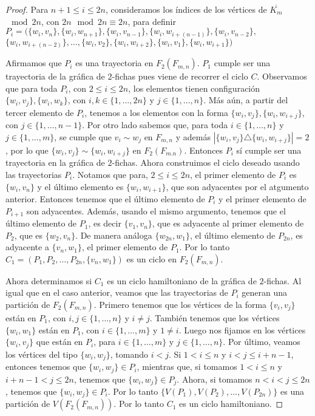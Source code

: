 \begin{proof}
    Para $n+1\leq i \leq 2n$, consideramos los \'indices de los v\'ertices de
    $\overline{K_m}$ $\mod 2n$, con $2n \mod 2n \equiv 2n$, para definir
    $P_i=(\{w_i,v_n\},\{w_i,w_{n+1}\},\{w_i,v_{n-1}\},\{w_i,w_{i+(n-1)}\},\{w_i,v_{n-2}\},$
    $\{w_i,w_{i+(n-2)}\},\dots,
    \{w_i,v_2\},\{w_i,w_{i+2}\},\{w_i,v_1\},\{w_i,w_{i+1}\})$

    Afirmamos que $P_i$ es una trayectoria en $F_2(F_{m,n})$. $P_1$ cumple ser
    una trayectoria de la gr\'afica de $2$-fichas pues viene de recorrer el
    ciclo $C$. Observamos que para toda $P_i$, con $2\leq i \leq 2n$, los
    elementos tienen configuraci\'on $\{w_i,v_j\},\{w_i,w_k\}$, con $i, k\in
    \{1, \dots, 2n\}$ y $j \in \{1, \dots, n\}$. M\'as a\'un, a partir del
    tercer elemento de $P_i$, tenemos a los elementos con la forma
    $\{w_i,v_j\},\{w_i,w_{i+j}\}$, con $j \in \{1, \dots, n-1\}$.  Por otro lado
    sabemos que, para toda $i \in \{1, \dots, n\}$ y $j \in \{1, \dots, m\}$, se
    cumple que $v_i \sim w_j$ en $F_{m,n}$ y adem\'as $|\{w_i,v_j\} \triangle
    \{w_i, w_{i+j}\}|=2$, por lo que $\{w_i,v_j\} \sim \{w_i, w_{i+j}\}$ en
    $F_2(F_{m.n})$. Entonces $P_i$ s\'i cumple ser una trayectoria en la
    gr\'afica de $2$-fichas. Ahora construimos el ciclo deseado usando las
    trayectorias $P_i$. Notamos que para, $2 \leq i \leq 2n$, el primer elemento
    de $P_i$ es $\{w_i, v_n\}$ y el \'ultimo elemento es $\{w_i, w_{i+1}\}$, que
    son adyacentes por el atgumento anterior. Entonces tenemos que el \'ultimo
    elemento de $P_i$ y el primer elemento de $P_{i+1}$ son adyacentes.
    Adem\'as, usando el mismo argumento, tenemos que el \'ultimo elemento de
    $P_1$, es decir $\{v_1,v_n\}$, que es adyacente al primer elemento de $P_2$,
    que es $\{w_2,v_n\}$. De manera an\'aloga $\{w_{2n},w_1\}$, el \'ultimo
    elemento de $P_{2n}$, es adyacente a $\{v_n,w_1\}$, el primer elemento de
    $P_1$. Por lo tanto $C_1 = (P_1,P_2, \dots, P_{2n},\{v_n,w_1\})$ es un ciclo
    en $F_2(F_{m,n})$. 
    
    Ahora determinamos si $C_1$ es un ciclo hamiltoniano de la gr\'afica de
    $2$-fichas. Al igual que en el caso anterior, veamos que las trayectorias de
    $P_i$ generan una partici\'on de $F_2(F_{m,n})$. Primero tenemos que los
    v\'ertices de la forma $\{v_i,v_j\}$ est\'an en $P_1$, con $i,j \in \{1,
    \dots, n\}$ y $i \neq j$. Tambi\'en tenemos que los v\'ertices $\{w_i,w_1\}$
    est\'an en $P_1$, con $i \in \{1, \dots, m\}$ y $1 \neq i$. Luego nos
    fijamos en los v\'ertices $\{w_i,v_j\}$ que est\'an en $P_i$, para $i\in
    \{1, \dots, m\}$ y $j \in \{1, \dots, n\}$. Por \'ultimo, veamos los
    v\'ertices del tipo $\{w_i,w_j\}$, tomando $i < j$. Si $1 < i \leq n$ y $i <
    j \leq i+n-1$, entonces tenemos que $\{w_i,w_j\} \in P_i$, mientras que, si
    tomamos $1 < i \leq n$ y $i+n-1 < j \leq 2n$, tenemos que $\{w_i,w_j\} \in
    P_j$. Ahora, si tomamos $n<i<j \leq 2n$, tenemos que $\{w_i,w_j\} \in P_i$.
    Por lo tanto $\{V(P_1),V(P_2), \dots, V(P_{2n})\}$ es una partici\'on de
    $V(F_2(F_{m,n}))$. Por lo tanto $C_1$ es un ciclo hamiltoniano.


\end{proof}
